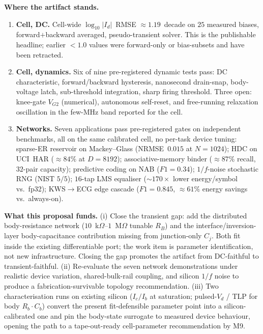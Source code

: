 \documentclass[fontsize=9pt]{article}
\begin{document}
\textbf{Where the artifact stands.}

\begin{enumerate}[leftmargin=1.6em,topsep=2pt,itemsep=2pt]
\item \textbf{Cell, DC.} Cell-wide $\log_{10}|I_d|$~RMSE
$\approx\!1.19$~decade on $25$ measured biases, forward$+$backward
averaged, pseudo-transient solver. This is the publishable headline;
earlier $<\!1.0$ values were forward-only or bias-subsets and have
been retracted.

\item \textbf{Cell, dynamics.} Six of nine pre-registered dynamic
tests pass: DC characteristic, forward/backward hysteresis,
nanosecond drain-snap, body-voltage latch, sub-threshold
integration, sharp firing threshold. Three open: knee-gate
$V_{G2}$ (numerical), autonomous self-reset, and free-running
relaxation oscillation in the few-MHz band reported for the cell.

\item \textbf{Networks.} Seven applications pass pre-registered
gates on independent benchmarks, all on the same calibrated cell,
no per-task device tuning: sparse-ER reservoir on Mackey--Glass
(NRMSE~$0.015$ at $N\!=\!1024$); HDC on UCI~HAR ($\approx 84\%$ at
$D\!=\!8192$); associative-memory binder ($\approx 87\%$ recall,
$32$-pair capacity); predictive coding on NAB ($F1\!=\!0.34$);
$1/f$-noise stochastic RNG (NIST $5/5$); $16$-tap LMS equaliser
($\sim\!170\times$ lower energy/symbol vs.\ fp32); KWS$\to$ECG edge
cascade ($F1\!=\!0.845$, $\approx\!61\%$ energy savings vs.\
always-on).
\end{enumerate}

\textbf{What this proposal funds.}
(i) Close the transient gap: add the distributed body-resistance
network ($10$~k$\Omega$--$1$~M$\Omega$ tunable $R_B$) and the
interface/inversion-layer body-capacitance contribution missing from
junction-only $C_j$. Both fit inside the existing differentiable
port; the work item is parameter identification, not new
infrastructure. Closing the gap promotes the artifact from
DC-faithful to transient-faithful.
(ii) Re-evaluate the seven network demonstrations under realistic
device variation, shared-bulk-rail coupling, and silicon $1/f$ noise
to produce a fabrication-survivable topology recommendation.
(iii) Two characterisation runs on existing silicon
($I_c/I_b$ at saturation; pulsed-$V_d$ / TLP for body
$R_b\!\cdot\!C_b$) convert the present fit-defensible parameter
point into a silicon-calibrated one and pin the body-state surrogate
to measured device behaviour, opening the path to a tape-out-ready
cell-parameter recommendation by M9.
\end{document}
